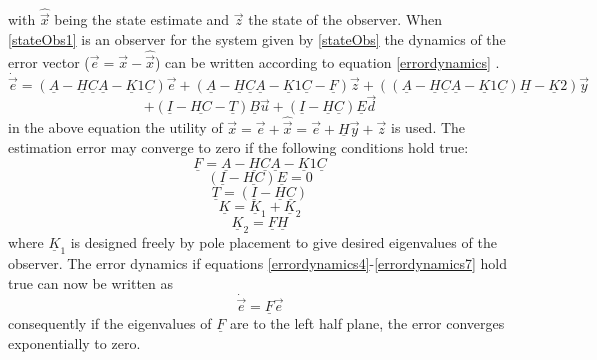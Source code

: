 with $\hat{\vec{x}}$ being the state estimate and $\vec{z}$ the state of the observer. When \eqref{stateObs1} is an observer for the system given by \eqref{stateObs} the dynamics of the error  vector ($\vec{e} = \vec{x} - \hat{\vec{x}}$) can be written according to equation \ref{errordynamics} \cite{UIO}.
\begin{equation}
\dot{\vec{e}}= (\underline A-\underline H \underline C \underline A-\underline K1 \underline C)\vec{e} + (\underline A-\underline H \underline C \underline A-\underline K1 \underline C - \underline F)\vec{z}+ ((\underline A-\underline H \underline C \underline A-\underline K1 \underline C )\underline H-\underline K2)\vec{y}
\label{errordynamics}
\end{equation}
\begin{equation*}
+ (\underline I - \underline {HC} - \underline T)\underline B\vec{u}	+(\underline I -\underline H\underline C)\underline E \vec{d}
\label{errordynamics45}
\end{equation*}
in the above equation the utility of $\vec{x}  = \vec{e} + \hat{\vec{x}} = \vec{e} + \underline H\vec{y}+\vec{z}$ is used. The estimation error may converge to zero if the following conditions hold true:
%
\begin{equation}
\underline F = \underline A-\underline H \underline C \underline A-\underline K1 \underline C
\label{errordynamics3}
\end{equation}
\begin{equation}
(\underline I - \underline{HC})\underline E = 0
\label{errordynamics4}
\end{equation}
\begin{equation}
\underline T = (\underline I - \underline H\underline C)
\label{errordynamics5}
\end{equation}
\begin{equation}
\underline K = \underline K_{1} +\underline K_{2}
\label{errordynamics6}
\end{equation}
\begin{equation}
\underline K_{2} =\underline F \underline H 
\label{errordynamics7}
\end{equation}
where $\underline K_{1}$ is designed freely by pole placement to give desired eigenvalues of the observer. The error dynamics if equations \ref{errordynamics4}-\ref{errordynamics7} hold true can now be written as 
\begin{equation}
\dot{\vec{e}} = \underline F \vec{e}
\label{errordynamics8}
\end{equation}
consequently if the eigenvalues of $\underline F$ are to the left half plane, the error converges exponentially to zero. 

